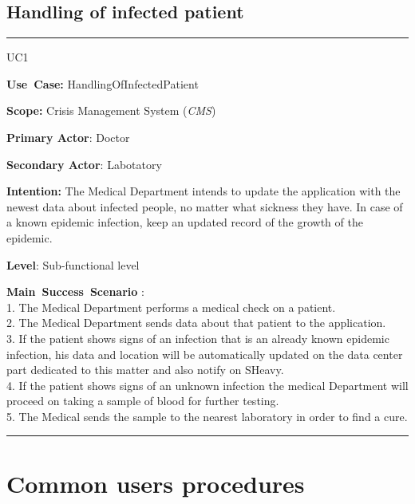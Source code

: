 \subsection{Handling of infected patient}
\vspace{0.5cm}
\hrule
\vspace{0.5cm}
\begin{lyxlist}{UC1}
\small{
\item [\textbf{Use~Case:}] HandlingOfInfectedPatient
\item [\textbf{Scope:}] Crisis Management System (\emph{CMS})
\item [\textbf{Primary Actor}:] Doctor
\item [\textbf{Secondary Actor}:] Labotatory
\item [\textbf{Intention:}]The Medical Department intends to update
the application with the newest data about infected people, no matter what
sickness they have. In case of a known epidemic infection, keep an updated
record of the growth of the epidemic.
\item [\textbf{Level}:]Sub-functional level
\item [\textbf{Main~Success~Scenario}]:\\
1. The Medical Department performs a medical check on a patient.\\
2. The Medical Department sends data about that patient to the application.\\
3. If the patient shows signs of an infection that is an already known epidemic infection, his data
and location will be automatically updated on the data center part dedicated to
this matter and also notify on SHeavy.\\
4. If the patient shows signs of an unknown infection the medical Department
will proceed on taking a sample of blood for further testing.\\
5. The Medical sends the sample to the nearest laboratory in order to find a
cure.\\
}
\end{lyxlist}
\hrule
\vspace{0.5cm} 

\section{Common users procedures}

